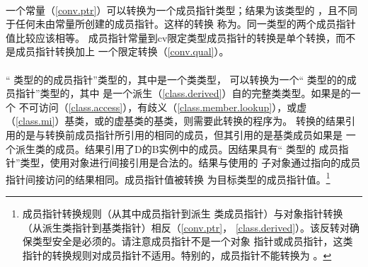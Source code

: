 \paragraph{} %
一个\nullp{}常量（\ref{conv.ptr}）可以转换为一个成员指针类型；结果为该类型的
，且不同于任何未由\nullp{}常量所创建的成员指针。这样的转换
称为。同一类型的两个\Null{}成员指针值比较应该相等。
\Null{}成员指针常量到cv限定类型成员指针的转换是单个转换，而不是成员指针转换加上
一个限定转换（\ref{conv.qual}）。

\paragraph{} %
“ 类型的的成员指针”类型的\prvalue{}，其中是一个类类型，
可以转换为一个“ 类型的的成员指针”类型的\prvalue{}，其中
是一个派生（\ref{class.derived}）自的完整类类型。如果是的一个
不可访问（\ref{class.access}），有歧义（\ref{class.member.lookup}），或虚
（\ref{class.mi}）基类，或的虚基类的基类，则需要此转换的程序为\illform{}。
转换的结果引用的是与转换前成员指针所引用的相同的成员，但其引用的是基类成员如果是
一个派生类的成员。结果引用了D的B实例中的成员。因结果具有“ 类型的
成员指针”类型，使用对象进行间接引用是合法的。结果与使用的
子对象通过指向的成员指针间接访问的结果相同。\Null{}成员指针值被转换
为目标类型的\Null{}成员指针值。\footnote{成员指针转换规则（从其中成员指针到派生
类成员指针）与对象指针转换（从派生类指针到基类指针）相反（\ref{conv.ptr}，
\ref{class.derived}）。该反转对确保类型安全是必须的。请注意成员指针不是一个对象
指针或成员指针，这类指针的转换规则对成员指针不适用。特别的，成员指针不能转换为
。}
